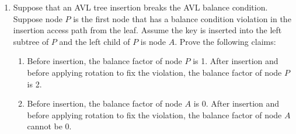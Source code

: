 \documentclass[12pt,a4paper]{article}
\theoremstyle{definition}
\begin{document}
\begin{enumerate}
\item  Suppose that an AVL tree insertion breaks the AVL balance condition. Suppose node $P$ is the ﬁrst node that has a balance condition violation in the insertion access path from the leaf. Assume the key is inserted into the left subtree of $P$ and the left child of $P$ is node $A$. Prove the following claims:
	\begin{enumerate}
		\item  Before insertion, the balance factor of node $P$ is 1. After insertion and before applying rotation to ﬁx the violation, the balance factor of node $P$ is 2.
		\item Before insertion, the balance factor of node $A$ is 0. After insertion and before applying rotation to ﬁx the violation, the balance factor of node $A$ cannot be 0.
	\end{enumerate}
	

\end{enumerate}
\end{document}

